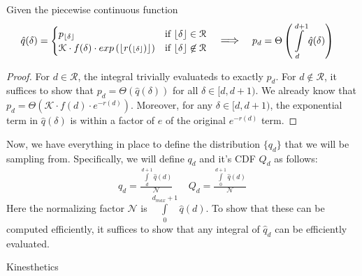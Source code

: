 \begin{lemma}
\label{lem:ReturnProbabilityPiecewiseContinuous}
Given the piecewise continuous function
{\large
    \begin{align*}
        \hat q(\delta) &=
        \begin{cases}
            p_{\floor\delta} &\mbox{if } \floor\delta \in \mathcal R \\ 
            \mathcal K\cdot f(\delta)\cdot exp\left(\lfloor{r({\scriptstyle\floor\delta})}\rfloor\right) & \mbox{if } \floor\delta \not\in \mathcal R
        \end{cases}
        && \mathlarger \implies
        && p_d = \Theta\left( \int\limits_d^{d+1} \hat q(\delta)\right)
    \end{align*}
}
\end{lemma}
\begin{proof}
For $d \in \mathcal R$, the integral trivially evaluateds to exactly $p_d$.
For $d\not\in \mathcal R$, it suffices to show that $p_d = \Theta\left( \hat q(\delta)\right)$ for all $\delta\in [d,d+1)$.
We already know that $p_d = \Theta\left( \mathcal K\cdot f(d)\cdot e^{-r(d)}\right)$.
Moreover, for any $\delta\in [d,d+1)$, the exponential term in $\hat q(\delta)$ is within a factor of $e$ of the original $e^{-r(d)}$ term.
\end{proof}

Now, we have everything in place to define the distribution $\{ q_d\}$ that we will be sampling from.
Specifically, we will define $q_d$ and it's CDF $Q_d$ as follows:
\begin{align}
    q_d = \frac{\int\limits_d^{d+1} \hat q(d)}{\mathcal N}
    && Q_d = \frac{\int\limits_0^{d+1} \hat q(d)}{\mathcal N}
\end{align}
Here the normalizing factor $\mathcal N$ is $\int\limits_0^{d_{max}+1} \hat q(d)$.
To show that these can be computed efficiently, it suffices to show that any integral of $\hat q_d$ can be efficiently evaluated.

\begin{theorem}
\label{thm:first_return_in_interval}
Kinesthetics
\end{theorem}



